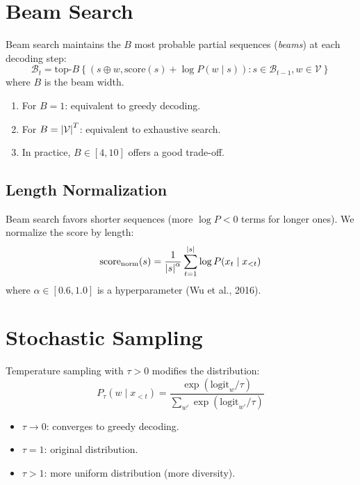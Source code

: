 \section{Beam Search}
\label{sec:gen:beam}

\begin{definition}
Beam search maintains the $B$ most probable partial sequences (\emph{beams})
at each decoding step:
\[
\mathcal{B}_t = \text{top-}B\left\{(s \oplus w, \text{score}(s) + \log P(w \mid s)) : s \in \mathcal{B}_{t-1}, w \in \mathcal{V}\right\}
\]
where $B$ is the beam width.
\end{definition}

\begin{proposition}
\begin{enumerate}
    \item For $B = 1$: equivalent to greedy decoding.
    \item For $B = \left| \mathcal{V} \right|^T$: equivalent to exhaustive search.
    \item In practice, $B \in [4, 10]$ offers a good trade-off.
\end{enumerate}
\end{proposition}

\subsection{Length Normalization}

Beam search favors shorter sequences (more $\log P < 0$ terms for longer ones).
We normalize the score by length:
\[
\text{score}_{\text{norm}}(s) = \frac{1}{\left| s \right|^\alpha} \sum_{t=1}^{\left| s \right|} \log P(x_t \mid x_{<t})
\]
where $\alpha \in [0.6, 1.0]$ is a hyperparameter (Wu et al., 2016).

\section{Stochastic Sampling}
\label{sec:gen:sampling}

\begin{definition}
Temperature sampling with $\tau > 0$ modifies the distribution:
\[
P_\tau(w \mid x_{<t}) = \frac{\exp(\text{logit}_w / \tau)}{\sum_{w'} \exp(\text{logit}_{w'} / \tau)}
\]
\begin{itemize}
    \item $\tau \to 0$: converges to greedy decoding.
    \item $\tau = 1$: original distribution.
    \item $\tau > 1$: more uniform distribution (more diversity).
\end{itemize}
\end{definition}

